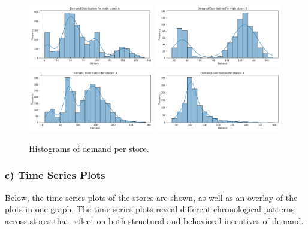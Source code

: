 \documentclass{article}
\begin{document}
\begin{figure}[H]
    \centering
    \includegraphics[width=0.49\textwidth]{figures/histogram_main_street_A.png}
    \includegraphics[width=0.49\textwidth]{figures/histogram_main_street_B.png}
    \includegraphics[width=0.49\textwidth]{figures/histogram_station_A.png}
    \includegraphics[width=0.49\textwidth]{figures/histogram_station_B.png}
    \caption{Histograms of demand per store.}
    \label{fig:histograms}
\end{figure}

\subsubsection*{c) Time Series Plots}
Below, the time-series plots of the stores are shown, as well as an overlay of the plots in one graph. The time series plots reveal different chronological patterns across stores that reflect on both structural and behavioral incentives of demand. 

\end{document}
